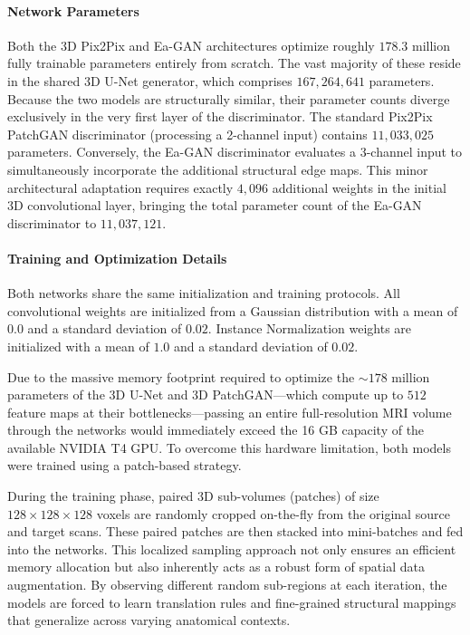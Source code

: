 \documentclass[11pt,a4paper]{article}
\begin{document}
\paragraph{Network Parameters}
Both the 3D Pix2Pix and Ea-GAN architectures optimize roughly $178.3$ million fully trainable parameters entirely from scratch. The vast majority of these reside in the shared 3D U-Net generator, which comprises $167{,}264{,}641$ parameters. Because the two models are structurally similar, their parameter counts diverge exclusively in the very first layer of the discriminator. The standard Pix2Pix PatchGAN discriminator (processing a 2-channel input) contains $11{,}033{,}025$ parameters. Conversely, the Ea-GAN discriminator evaluates a 3-channel input to simultaneously incorporate the additional structural edge maps. This minor architectural adaptation requires exactly $4{,}096$ additional weights in the initial 3D convolutional layer, bringing the total parameter count of the Ea-GAN discriminator to $11{,}037{,}121$.

\paragraph{Training and Optimization Details}

Both networks share the same initialization and training protocols. All convolutional weights are initialized from a Gaussian distribution with a mean of $0.0$ and a standard deviation of $0.02$. Instance Normalization weights are initialized with a mean of $1.0$ and a standard deviation of $0.02$.

Due to the massive memory footprint required to optimize the ${\sim}178$ million parameters of the 3D U-Net and 3D PatchGAN—which compute up to $512$ feature maps at their bottlenecks—passing an entire full-resolution MRI volume through the networks would immediately exceed the 16 GB capacity of the available NVIDIA T4 GPU. To overcome this hardware limitation, both models were trained using a patch-based strategy.

During the training phase, paired 3D sub-volumes (patches) of size $128 \times 128 \times 128$ voxels are randomly cropped on-the-fly from the original source and target scans. These paired patches are then stacked into mini-batches and fed into the networks. This localized sampling approach not only ensures an efficient memory allocation but also inherently acts as a robust form of spatial data augmentation. By observing different random sub-regions at each iteration, the models are forced to learn translation rules and fine-grained structural mappings that generalize across varying anatomical contexts. 
\end{document}
